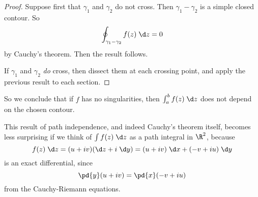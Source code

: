 \documentclass[a4paper]{article}
\begin{document}
\begin{proof}
  Suppose first that $\gamma_1$ and $\gamma_2$ do not cross. Then $\gamma_1 - \gamma_2$ is a simple closed contour. So
  \[
    \oint_{\gamma_1 - \gamma_2} f(z)\;\d z = 0
  \]
  by Cauchy's theorem. Then the result follows.

  If $\gamma_1$ and $\gamma_2$ \emph{do} cross, then dissect them at each crossing point, and apply the previous result to each section.
\end{proof}
So we conclude that if $f$ has no singularities, then $\int_a^b f(z)\;\d z$ does not depend on the chosen contour.

This result of path independence, and indeed Cauchy's theorem itself, becomes less surprising if we think of $\int f(z)\;\d z$ as a path integral in $\R^2$, because
\[
  f(z)\;\d z = (u + iv)(\d z + i\;\d y) = (u + iv) \;\d x + (-v + iu)\;\d y
\]
is an exact differential, since
\[
  \pd{y} (u + iv) = \pd{x} (-v + iu)
\]
from the Cauchy-Riemann equations.
\end{document}
